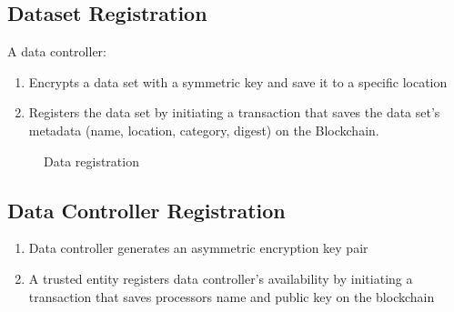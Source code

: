 \subsection{Dataset Registration}
\label{solution:flow:reg_data}

A data controller:

\begin{enumerate}
  \item Encrypts a data set with a symmetric key and save it to a specific location
  \item Registers the data set by initiating a transaction that saves the data set's metadata (name, location, category, digest) on the Blockchain.
\end{enumerate}

\begin{figure}[ht!]
  \caption{Data registration}
  \label{fig:arc:reg}
\end{figure}

\subsection{Data Controller Registration}
\label{solution:flow:con_reg}

\begin{enumerate}
  \item Data controller generates an asymmetric encryption key pair
  \item A trusted entity registers data controller's availability by initiating a transaction that saves processors name and public key on the blockchain
\end{enumerate}

